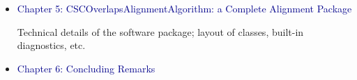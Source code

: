 \documentclass[compress]{beamer}
\begin{document}
\begin{frame}
\begin{itemize}
\item \textcolor{darkblue}{Chapter 5: CSCOverlapsAlignmentAlgorithm: a Complete Alignment Package}

\begin{minipage}{\linewidth}
\tiny Technical details of the software package; layout of classes, built-in diagnostics, etc.
\end{minipage}

\item \textcolor{darkblue}{Chapter 6: Concluding Remarks}
\end{itemize}

\label{numpages}
\end{frame}
\end{document}

